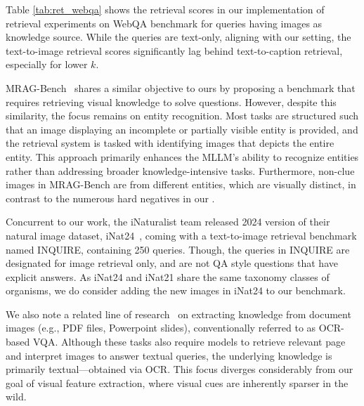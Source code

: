 Table \ref{tab:ret_webqa} shows the retrieval scores in our implementation of retrieval experiments on WebQA benchmark for queries having images as knowledge source. While the queries are text-only, aligning with our setting, the text-to-image retrieval scores significantly lag behind text-to-caption retrieval, especially for lower $k$.

\begin{table}[h]
    \centering
    \caption{Retrieval scores for WebQA dataset.}
    \label{tab:ret_webqa}
\end{table}

MRAG-Bench~\citep{hu2024mragbenchvisioncentricevaluationretrievalaugmented} shares a similar objective to ours by proposing a benchmark that requires retrieving visual knowledge to solve questions. However, despite this similarity, the focus remains on entity recognition. Most tasks are structured such that an image displaying an incomplete or partially visible entity is provided, and the retrieval system is tasked with identifying images that depicts the entire entity. This approach primarily enhances the MLLM's ability to recognize entities rather than addressing broader knowledge-intensive tasks. Furthermore, non-clue images in MRAG-Bench are from different entities, which are visually distinct, in contrast to the numerous hard negatives in our \ds. 

Concurrent to our work, the iNaturalist team released 2024 version of their natural image dataset, iNat24~\citep{vendrow2024inquire}, coming with a text-to-image retrieval benchmark named INQUIRE, containing 250 queries. Though, the queries in INQUIRE are designated for image retrieval only, and are not QA style questions that have explicit answers. As iNat24 and iNat21 share the same taxonomy classes of organisms, we do consider adding the new images in iNat24 to our benchmark.

We also note a related line of research~\citep{10.1609/aaai.v37i11.26598,Van_Landeghem_2023_ICCV} on extracting knowledge from document images (e.g., PDF files, Powerpoint slides), conventionally referred to as OCR-based VQA. Although these tasks also require models to retrieve relevant page and interpret images to answer textual queries, the underlying knowledge is primarily textual—obtained via OCR. This focus diverges considerably from our goal of visual feature extraction, where visual cues are inherently sparser in the wild.